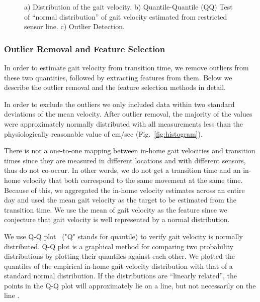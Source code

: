 \documentclass[journal]{IEEEtran}
\begin{document}
\begin{figure}[ht]
\centering
{}
\caption{a) Distribution  of the gait velocity. b) Quantile-Quantile (QQ) Test of ``normal distribution'' of gait velocity estimated from restricted sensor line. c) Outlier Detection.}
\label{fig:walkSpedAnalysis}
\end{figure}


\subsubsection{Outlier Removal and Feature Selection}
\label{sec:DataAnalysisAndFeatureSelection}

In order to estimate gait velocity from transition time, we remove outliers from these two quantities, followed by extracting features from them. Below we describe the outlier removal and the feature selection methods in detail.


In order to exclude the outliers we only included data within two standard deviations of the mean velocity. After outlier removal, the majority of the values were approximately normally distributed with all measurements less than the physiologically reasonable value of  cm/sec (Fig.~\ref{fig:histogram}). 



There is not a one-to-one mapping between in-home gait velocities and transition times since they are measured in different locations and with different sensors, thus do not co-occur. In other words, we do not get a transition time and an in-home velocity that both correspond to the same movement at the same time.  Because of this, we aggregated the in-home velocity estimates across an entire day and used the mean gait velocity as the target to be estimated from the transition time. We use the mean of gait velocity as the feature since  we conjecture that gait velocity is well represented by a normal distribution. 


We use Q-Q plot~\cite{wilk1968probability} ("Q" stands for quantile) to verify gait velocity is normally distributed. Q-Q plot is a graphical method for comparing two probability distributions by plotting their quantiles against each other. We plotted the quantiles of the empirical in-home gait velocity distribution with that of a standard normal distribution. 
If the distributions are ``linearly related'', the points in the Q-Q plot will approximately lie on a line, but not necessarily on the line . 
\end{document}
